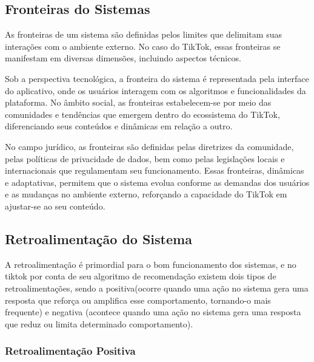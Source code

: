 \newpage
\subsection{Fronteiras do Sistemas}

As fronteiras de um sistema são definidas pelos limites que delimitam suas interações com o ambiente externo. No caso do TikTok, essas fronteiras se manifestam em diversas dimensões, incluindo aspectos técnicos. \vskip0.3cm

Sob a perspectiva tecnológica, a fronteira do sistema é representada pela interface do aplicativo, onde os usuários interagem com os algoritmos e funcionalidades da plataforma. No âmbito social, as fronteiras estabelecem-se por meio das comunidades e tendências que emergem dentro do ecossistema do TikTok, diferenciando seus conteúdos e dinâmicas em relação a outro.\vskip0.3cm

No campo jurídico, as fronteiras são definidas pelas diretrizes da comunidade, pelas políticas de privacidade de dados, bem como pelas legislações locais e internacionais que regulamentam seu funcionamento. Essas fronteiras, dinâmicas e adaptativas, permitem que o sistema evolua conforme as demandas dos usuários e as mudanças no ambiente externo, reforçando a capacidade do TikTok em ajustar-se ao seu conteúdo.


\subsection{Retroalimentação do Sistema}

A  retroalimentação é primordial para o bom funcionamento dos sistemas, e no tiktok  por conta de seu algoritmo de recomendação existem dois tipos de retroalimentações, sendo a positiva(ocorre quando uma ação no sistema gera uma resposta que reforça ou amplifica esse comportamento, tornando-o mais frequente) e negativa (acontece quando uma ação no sistema gera uma resposta que reduz ou limita determinado comportamento).

\subsubsection{Retroalimentação Positiva}

